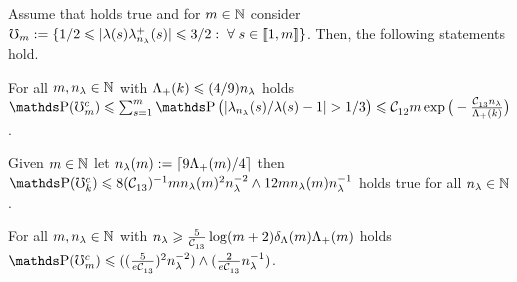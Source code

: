 \begin{lm}\label{ge:re:evrest}
Assume that  holds true and for $\Di\in\Nz$ consider
  $\aixEv[\Di]:=\{1/2\leq|\fedf[(s)]\hfedfmpI[(s)]|\leq3/2:\;\forall\;s\in\nset{1,\Di}\}$.
  Then, the following statements hold.
\begin{resListeN}[]
\item\label{ge:re:evrest:i}
For all $\Di,\ssE\in\Nz$ with  $\miSv[k]\leq
(4/9)\ssE$ holds $\P(\aixEv^c)\leq \sum_{s=1}^{\Di}\P\big(|\hfedf[(s)]/\fedf[(s)]-1|>1/3\big)\leq \cst{12}\Di\exp\big(-\tfrac{\cst{13}\ssE}{\miSv[k]}\big)$.
\item\label{ge:re:evrest:ii}
Given  $\Di\in\Nz$ let $\ssE(\Di):=\ceil{9\miSv/4}$  then 
$\P(\aixEv[k]^c)\leq8 (\cst{13})^{-1}\Di\ssE(\Di)^2\ssE^{-2}\wedge12\Di\ssE(\Di)\ssE^{-1}$
holds true for all
$\ssE\in\Nz$.
\item\label{ge:re:evrest:iii}
For all $\Di,\ssE\in\Nz$ with $\ssE \geq \tfrac{5}{\cst{13}}\log(\Di+2)\cmiSv\miSv$ holds $\P(\aixEv^c)\leq((\tfrac{5}{e \cst{13}})^{2}\ssE^{-2})\wedge(\tfrac{2}{e \cst{13}}\ssE^{-1})$.
\end{resListeN}
\end{lm}
